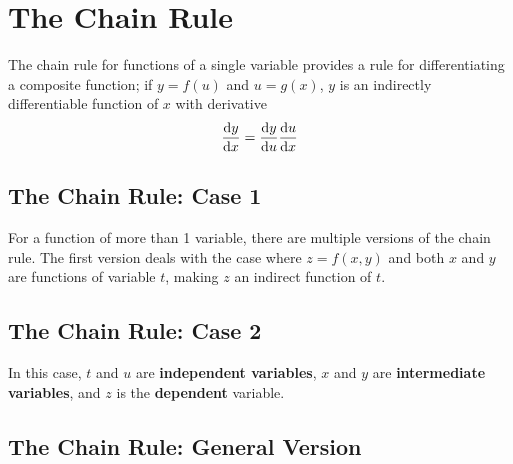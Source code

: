\documentclass[../Calculus_\Roman{3}]{subfiles}
\begin{document}
	\section{The Chain Rule}
		The chain rule for functions of a single variable provides a rule for differentiating a composite function; if $y = f(u)$ and $u = g(x)$, $y$ is an indirectly differentiable function of $x$ with derivative
			\[\frac{\mathrm{d} y}{\mathrm{d} x} = \frac{\mathrm{d} y}{\mathrm{d} u}\frac{\mathrm{d} u}{\mathrm{d} x}\]
		\subsection*{The Chain Rule: Case 1}
				For a function of more than 1 variable, there are multiple versions of the chain rule. The first version deals with the case where $z = f(x, y)$ and both $x$ and $y$ are functions of variable $t$, making $z$ an indirect function of $t$.
		\subsection*{The Chain Rule: Case 2}
			In this case, $t$ and $u$ are \textbf{independent variables}, $x$ and $y$ are \textbf{intermediate variables}, and $z$ is the \textbf{dependent} variable.
		\subsection*{The Chain Rule: General Version}
\end{document}
